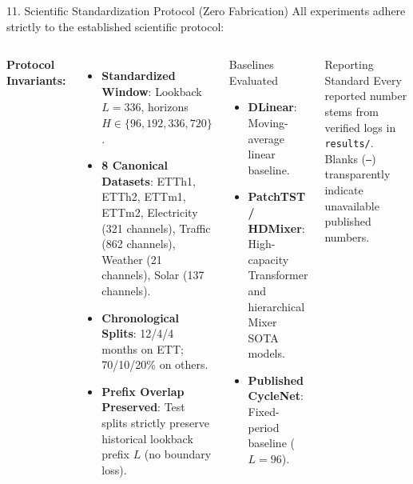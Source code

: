 \documentclass[aspectratio=169, 10pt]{beamer}
\begin{document}
\begin{frame}{11. Scientific Standardization Protocol (Zero Fabrication)}
All experiments adhere strictly to the established scientific protocol:
\vspace{0.2cm}
\begin{columns}[T]
\textbf{Protocol Invariants:}
\begin{itemize}
    \item \textbf{Standardized Window}: Lookback $L=336$, horizons $H \in \{96, 192, 336, 720\}$.
    \item \textbf{8 Canonical Datasets}: ETTh1, ETTh2, ETTm1, ETTm2, Electricity (321 channels), Traffic (862 channels), Weather (21 channels), Solar (137 channels).
    \item \textbf{Chronological Splits}: 12/4/4 months on ETT; 70/10/20\% on others.
    \item \textbf{Prefix Overlap Preserved}: Test splits strictly preserve historical lookback prefix $L$ (no boundary loss).
\end{itemize}

\begin{alertblock}{Baselines Evaluated}
\begin{itemize}
    \item \textbf{DLinear}: Moving-average linear baseline.
    \item \textbf{PatchTST / HDMixer}: High-capacity Transformer and hierarchical Mixer SOTA models.
    \item \textbf{Published CycleNet}: Fixed-period baseline ($L=96$).
\end{itemize}
\end{alertblock}
\begin{exampleblock}{Reporting Standard}
Every reported number stems from verified logs in \texttt{results/}. Blanks (\texttt{--}) transparently indicate unavailable published numbers.
\end{exampleblock}
\end{columns}
\end{frame}
\end{document}
